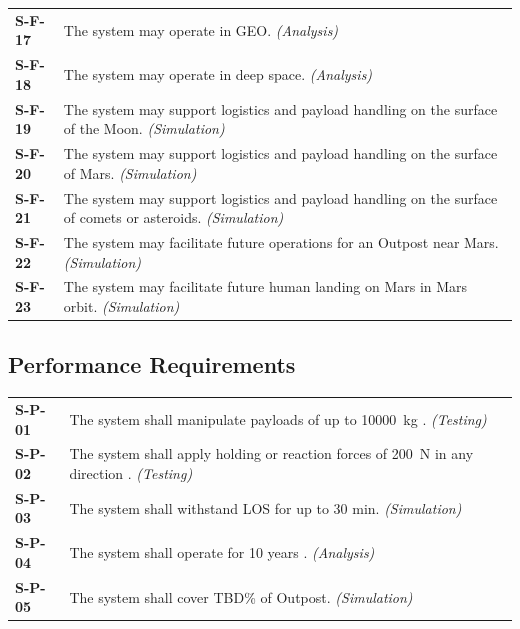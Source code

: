\documentclass[12pt, letterpaper]{article}
\begin{document}
\begin{longtable}{P{1.5cm}P{14.25cm}}
\textbf{S-F-17}	& The system may operate in GEO. \textit{(Analysis)}																			\\
\textbf{S-F-18}	& The system may operate in deep space. \textit{(Analysis)}													\\
\textbf{S-F-19}	& The system may support logistics and payload handling on the surface of the Moon. \textit{(Simulation)}					\\
\textbf{S-F-20}	& The system may support logistics and payload handling on the surface of Mars. \textit{(Simulation)}						\\
\textbf{S-F-21}	& The system may support logistics and payload handling on the surface of comets or asteroids. \textit{(Simulation)}		\\
\textbf{S-F-22}	& The system may facilitate future operations for an Outpost near Mars. \textit{(Simulation)}								\\
\textbf{S-F-23}	& The system may facilitate future human landing on Mars in Mars orbit. \textit{(Simulation)}							\\
\end{longtable}

\subsection{Performance Requirements}
\begin{longtable}{P{1.5cm}P{14.25cm}}
\textbf{S-P-01}	& The system shall manipulate payloads of up to \SI{10000}{\kg} \cite {RFP}. \textit{(Testing)}						\\
\textbf{S-P-02}	& The system shall apply holding or reaction forces of \SI{200}{\N} in any direction \cite{RFP}. \textit{(Testing)}		\\
\textbf{S-P-03}	& The system shall withstand LOS for up to 30 min. \textit{(Simulation)}												\\
\textbf{S-P-04}	& The system shall operate for 10 years  \cite{RFP}. \textit{(Analysis)}													\\
\textbf{S-P-05}	& The system shall cover TBD\% of Outpost. \textit{(Simulation)}												\\
\end{longtable}
\newpage
\end{document}

